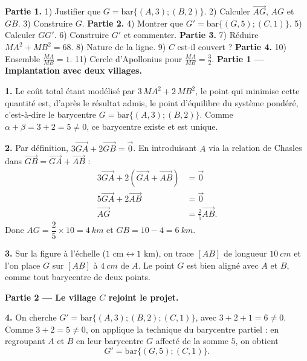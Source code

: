 \documentclass[11pt]{article}
\newcommand{\cle}[1]{{\popxbold\color{popdark}#1}}
\begin{document}
\begin{exoresolu}
\textbf{Partie 1.} 1) Justifier que $G = \mathrm{bar}\{(A,3);(B,2)\}$. 2) Calculer $\overrightarrow{AG}$, $AG$ et $GB$. 3) Construire $G$. \textbf{Partie 2.} 4) Montrer que $G' = \mathrm{bar}\{(G,5);(C,1)\}$. 5) Calculer $GG'$. 6) Construire $G'$ et commenter. \textbf{Partie 3.} 7) Réduire $MA^2 + MB^2 = 68$. 8) Nature de la ligne. 9) $C$ est-il couvert ? \textbf{Partie 4.} 10) Ensemble $\frac{MA}{MB}=1$. 11) Cercle d'Apollonius pour $\frac{MA}{MB}=\frac{3}{2}$.
\tcblower
\textbf{Partie 1 — Implantation avec deux villages.}

\textbf{1.} Le coût total étant modélisé par $3\,MA^2 + 2\,MB^2$, le point qui minimise cette quantité est, d'après le résultat admis, le point d'équilibre du système pondéré, c'est-à-dire le \cle{barycentre} $G = \mathrm{bar}\{(A, 3) ; (B, 2)\}$. Comme $\alpha + \beta = 3 + 2 = 5 \neq 0$, ce barycentre existe et est unique.

\textbf{2.} Par définition, $3\overrightarrow{GA} + 2\overrightarrow{GB} = \vec{0}$. En introduisant $A$ via la relation de Chasles dans $\overrightarrow{GB} = \overrightarrow{GA} + \overrightarrow{AB}$ :
\begin{align*}
3\overrightarrow{GA} + 2\left(\overrightarrow{GA} + \overrightarrow{AB}\right) &= \vec{0} \\
5\overrightarrow{GA} + 2\overrightarrow{AB} &= \vec{0} \\
\overrightarrow{AG} &= \frac{2}{5}\overrightarrow{AB}.
\end{align*}
Donc $AG = \dfrac{2}{5} \times 10 = \SI{4}{km}$ et $GB = 10 - 4 = \SI{6}{km}$.

\textbf{3.} Sur la figure à l'échelle ($1 \text{ cm} \leftrightarrow 1 \text{ km}$), on trace $[AB]$ de longueur $\SI{10}{cm}$ et l'on place $G$ sur $[AB]$ à $\SI{4}{cm}$ de $A$. Le point $G$ est bien \cle{aligné} avec $A$ et $B$, comme tout barycentre de deux points.

\textbf{Partie 2 — Le village $C$ rejoint le projet.}

\textbf{4.} On cherche $G' = \mathrm{bar}\{(A,3);(B,2);(C,1)\}$, avec $3+2+1 = 6 \neq 0$. Comme $3 + 2 = 5 \neq 0$, on applique la technique du \cle{barycentre partiel} : en regroupant $A$ et $B$ en leur barycentre $G$ affecté de la somme $5$, on obtient
\[ G' = \mathrm{bar}\{(G, 5) ; (C, 1)\}. \]


\end{exoresolu}
\end{document}
